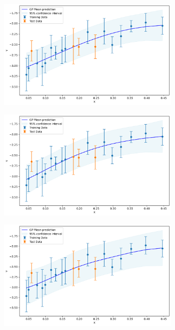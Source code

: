\documentclass{article}
\begin{document}
\begin{figure}[H]
    \centering
    \begin{subfigure}[b]{0.3\textwidth}
        \centering
        \includegraphics[width=\textwidth]{LatexPlots/1dplots/MCMCmeangpr.png}
    \end{subfigure}
    \hfill
    \begin{subfigure}[b]{0.3\textwidth}
        \centering
        \includegraphics[width=\textwidth]{LatexPlots/1dplots/MCMCpeakgpr.png}
    \end{subfigure}
    \hfill
    \begin{subfigure}[b]{0.3\textwidth}
        \centering
        \includegraphics[width=\textwidth]{LatexPlots/1dplots/MCMCaveragegpr.png}

\end{subfigure}
\end{figure}
\end{document}
